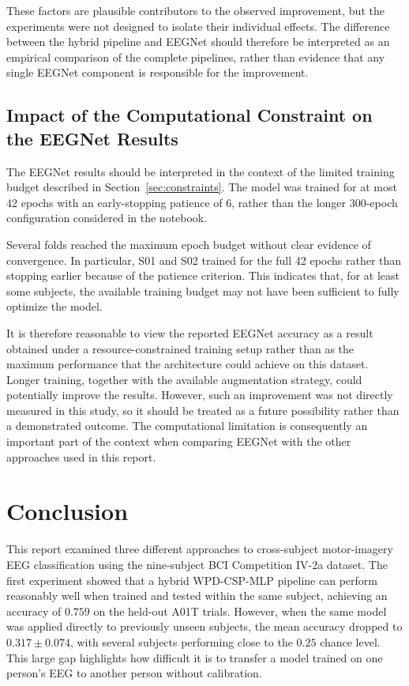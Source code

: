 \documentclass[11pt,a4paper]{article}
\begin{document}
These factors are plausible contributors to the observed improvement, but the experiments were
not designed to isolate their individual effects. The difference between the hybrid pipeline
and EEGNet should therefore be interpreted as an empirical comparison of the complete pipelines,
rather than evidence that any single EEGNet component is responsible for the improvement.

\subsection{Impact of the Computational Constraint on the EEGNet Results}

The EEGNet results should be interpreted in the context of the limited training budget described
in Section~\ref{sec:constraints}. The model was trained for at most 42 epochs with an early-stopping
patience of 6, rather than the longer 300-epoch configuration considered in the notebook.

Several folds reached the maximum epoch budget without clear evidence of convergence. In particular,
S01 and S02 trained for the full 42 epochs rather than stopping earlier because of the patience
criterion. This indicates that, for at least some subjects, the available training budget may not
have been sufficient to fully optimize the model.

It is therefore reasonable to view the reported EEGNet accuracy as a result obtained under a
resource-constrained training setup rather than as the maximum performance that the architecture
could achieve on this dataset. Longer training, together with the available augmentation strategy,
could potentially improve the results. However, such an improvement was not directly measured in
this study, so it should be treated as a future possibility rather than a demonstrated outcome.
The computational limitation is consequently an important part of the context when comparing
EEGNet with the other approaches used in this report.

	
	
	\section{Conclusion}
	\label{sec:conclusion}
	
	This report examined three different approaches to cross-subject motor-imagery EEG classification
	using the nine-subject BCI Competition IV-2a dataset. The first experiment showed that a hybrid
	WPD-CSP-MLP pipeline can perform reasonably well when trained and tested within the same subject,
	achieving an accuracy of $0.759$ on the held-out A01T trials. However, when the same model was
	applied directly to previously unseen subjects, the mean accuracy dropped to
	$0.317 \pm 0.074$, with several subjects performing close to the $0.25$ chance level. This
	large gap highlights how difficult it is to transfer a model trained on one person's EEG to
	another person without calibration.
	
\end{document}
